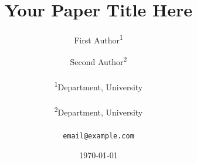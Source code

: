 \documentclass[12pt]{article}
\title{\textbf{Your Paper Title Here}}
\author{
  First Author\textsuperscript{1} \and
  Second Author\textsuperscript{2} \\\\
  \textsuperscript{1}Department, University \\\\
  \textsuperscript{2}Department, University \\\\
  \texttt{email@example.com}
}
\date{\today}
\begin{document}
\mbox{} %
\end{document}
